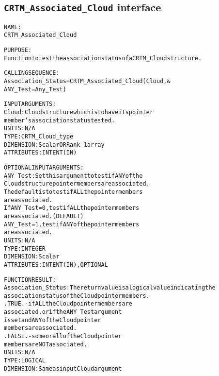 \subsection{\texttt{CRTM\_Associated\_Cloud} interface}
  \label{sec:CRTM_Associated_Cloud_interface}
  \begin{alltt}
 
  NAME:
        CRTM_Associated_Cloud
 
  PURPOSE:
        Function to test the association status of a CRTM_Cloud structure.
 
  CALLING SEQUENCE:
        Association_Status = CRTM_Associated_Cloud( Cloud            , &
                                                    ANY_Test=Any_Test  )
 
  INPUT ARGUMENTS:
        Cloud:               Cloud structure which is to have its pointer
                             member's association status tested.
                             UNITS:      N/A
                             TYPE:       CRTM_Cloud_type
                             DIMENSION:  Scalar OR Rank-1 array
                             ATTRIBUTES: INTENT(IN)
 
  OPTIONAL INPUT ARGUMENTS:
        ANY_Test:            Set this argument to test if ANY of the
                             Cloud structure pointer members are associated.
                             The default is to test if ALL the pointer members
                             are associated.
                             If ANY_Test = 0, test if ALL the pointer members
                                              are associated.  (DEFAULT)
                                ANY_Test = 1, test if ANY of the pointer members
                                              are associated.
                             UNITS:      N/A
                             TYPE:       INTEGER
                             DIMENSION:  Scalar
                             ATTRIBUTES: INTENT(IN), OPTIONAL
 
  FUNCTION RESULT:
        Association_Status:  The return value is a logical value indicating the
                             association status of the Cloud pointer members.
                             .TRUE.  - if ALL the Cloud pointer members are
                                       associated, or if the ANY_Test argument
                                       is set and ANY of the Cloud pointer
                                       members are associated.
                             .FALSE. - some or all of the Cloud pointer
                                       members are NOT associated.
                             UNITS:      N/A
                             TYPE:       LOGICAL
                             DIMENSION:  Same as input Cloud argument
 
  \end{alltt}
